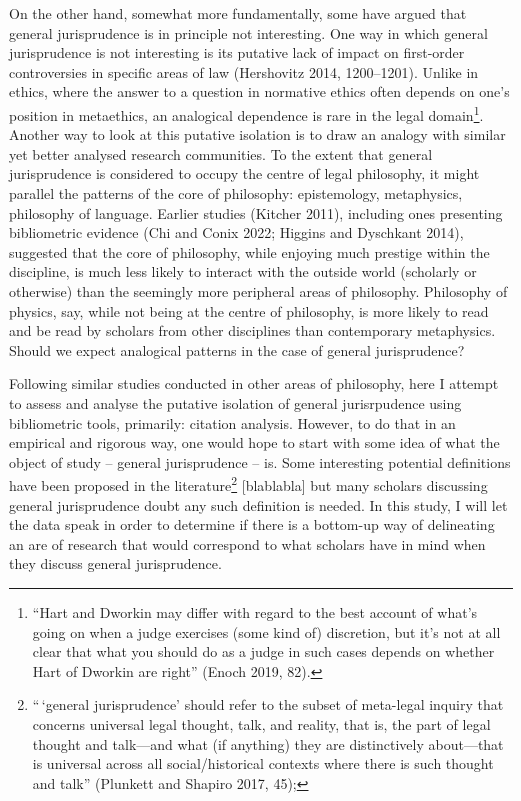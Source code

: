 \documentclass[
]{article}
\begin{document}
On the other hand, somewhat more fundamentally, some have argued that general jurisprudence is in principle not interesting. One way in which general jurisprudence is not interesting is its putative lack of impact on first-order controversies in specific areas of law (Hershovitz 2014, 1200--1201). Unlike in ethics, where the answer to a question in normative ethics often depends on one's position in metaethics, an analogical dependence is rare in the legal domain\footnote{``Hart and Dworkin may differ with regard to the best account of what's going on when a judge exercises (some kind of) discretion, but it's not at all clear that what you should do as a judge in such cases depends on whether Hart of Dworkin are right'' (Enoch 2019, 82).}. Another way to look at this putative isolation is to draw an analogy with similar yet better analysed research communities. To the extent that general jurisprudence is considered to occupy the centre of legal philosophy, it might parallel the patterns of the core of philosophy: epistemology, metaphysics, philosophy of language. Earlier studies (Kitcher 2011), including ones presenting bibliometric evidence (Chi and Conix 2022; Higgins and Dyschkant 2014), suggested that the core of philosophy, while enjoying much prestige within the discipline, is much less likely to interact with the outside world (scholarly or otherwise) than the seemingly more peripheral areas of philosophy. Philosophy of physics, say, while not being at the centre of philosophy, is more likely to read and be read by scholars from other disciplines than contemporary metaphysics. Should we expect analogical patterns in the case of general jurisprudence?

Following similar studies conducted in other areas of philosophy, here I attempt to assess and analyse the putative isolation of general jurisrpudence using bibliometric tools, primarily: citation analysis. However, to do that in an empirical and rigorous way, one would hope to start with some idea of what the object of study -- general jurisprudence -- is. Some interesting potential definitions have been proposed in the literature\footnote{``\,`general jurisprudence' should refer to the subset of meta-legal inquiry that concerns universal legal thought, talk, and reality, that is, the part of legal thought and talk---and what (if anything) they are distinctively about---that is universal across all social/historical contexts where there is such thought and talk'' (Plunkett and Shapiro 2017, 45);} {[}blablabla{]} but many scholars discussing general jurisprudence doubt any such definition is needed. In this study, I will let the data speak in order to determine if there is a bottom-up way of delineating an are of research that would correspond to what scholars have in mind when they discuss general jurisprudence.
\end{document}
